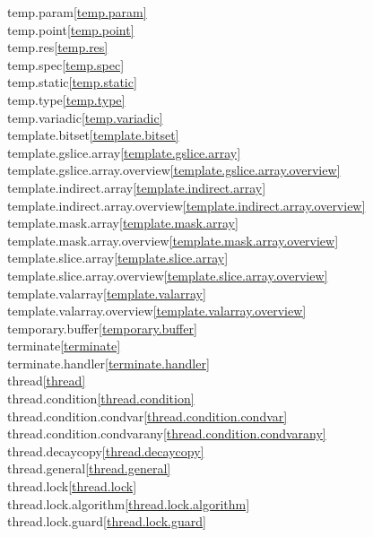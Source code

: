 \begin{multicols}{2}
temp.param\quad\ref{temp.param}\\
temp.point\quad\ref{temp.point}\\
temp.res\quad\ref{temp.res}\\
temp.spec\quad\ref{temp.spec}\\
temp.static\quad\ref{temp.static}\\
temp.type\quad\ref{temp.type}\\
temp.variadic\quad\ref{temp.variadic}\\
template.bitset\quad\ref{template.bitset}\\
template.gslice.array\quad\ref{template.gslice.array}\\
template.gslice.array.overview\quad\ref{template.gslice.array.overview}\\
template.indirect.array\quad\ref{template.indirect.array}\\
template.indirect.array.overview\quad\ref{template.indirect.array.overview}\\
template.mask.array\quad\ref{template.mask.array}\\
template.mask.array.overview\quad\ref{template.mask.array.overview}\\
template.slice.array\quad\ref{template.slice.array}\\
template.slice.array.overview\quad\ref{template.slice.array.overview}\\
template.valarray\quad\ref{template.valarray}\\
template.valarray.overview\quad\ref{template.valarray.overview}\\
temporary.buffer\quad\ref{temporary.buffer}\\
terminate\quad\ref{terminate}\\
terminate.handler\quad\ref{terminate.handler}\\
thread\quad\ref{thread}\\
thread.condition\quad\ref{thread.condition}\\
thread.condition.condvar\quad\ref{thread.condition.condvar}\\
thread.condition.condvarany\quad\ref{thread.condition.condvarany}\\
thread.decaycopy\quad\ref{thread.decaycopy}\\
thread.general\quad\ref{thread.general}\\
thread.lock\quad\ref{thread.lock}\\
thread.lock.algorithm\quad\ref{thread.lock.algorithm}\\
thread.lock.guard\quad\ref{thread.lock.guard}\\

\end{multicols}
